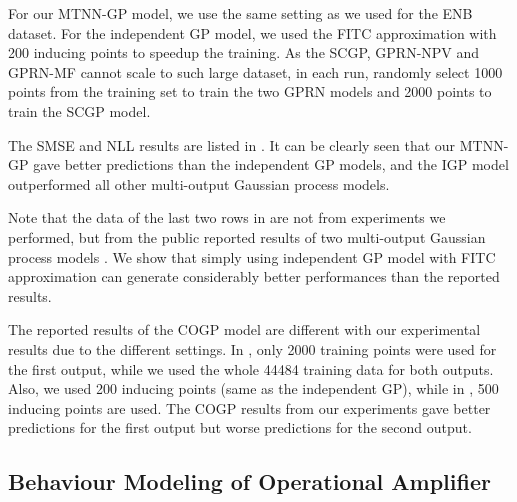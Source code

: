 For our MTNN-GP model, we use the same setting as we used for the ENB dataset. For the independent GP model, we used the FITC approximation with 200 inducing points to speedup the training. As the SCGP, GPRN-NPV and GPRN-MF cannot scale to such large dataset, in each run, randomly select 1000 points from the training set to train the two GPRN models and 2000 points to train the SCGP model. 

The SMSE and NLL results are listed in . It can be clearly seen that our MTNN-GP gave better predictions than the independent GP models, and the IGP model outperformed all other multi-output Gaussian process models. 

Note that the data of the last two rows in  are not from experiments we performed, but from the public reported results of two multi-output Gaussian process models \cite{nguyen2014collaborative, NIPS2015_5665}. We show that simply using independent GP model with FITC approximation can generate considerably better performances than the reported results.

The reported results of the COGP model are different with our experimental results due to the different settings. In \cite{nguyen2014collaborative}, only 2000 training points were used for the first output, while we used the whole 44484 training data for both outputs. Also, we used 200 inducing points (same as the independent GP), while in \cite{nguyen2014collaborative}, 500 inducing points are used. The COGP results from our experiments gave better predictions for the first output but worse predictions for the second output.


\subsection{Behaviour Modeling of Operational Amplifier}\label{sec:dac14}


